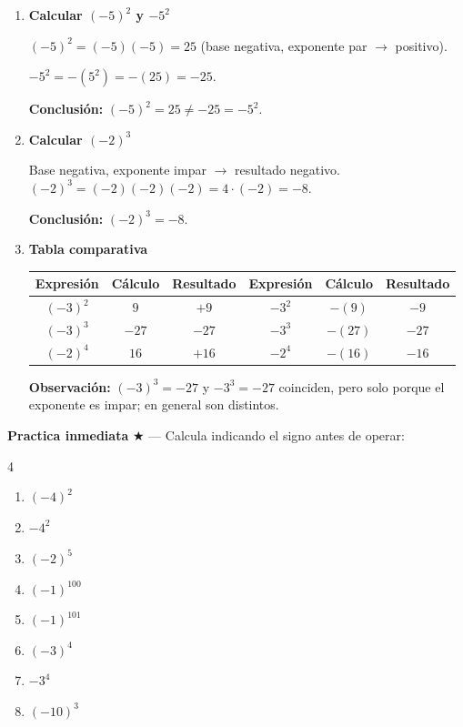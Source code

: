 \documentclass[11pt, letterpaper]{article}
\begin{document}
\begin{tcolorbox}[examplebox, title={Ejemplos --- potencias de base entera}]
\begin{enumerate}[label=\textbf{Ej. \arabic*.}, leftmargin=*, itemsep=12pt]

\item \textbf{Calcular $(-5)^2$ y $-5^2$}

$(-5)^2=(-5)(-5)=25$ (base negativa, exponente par $\to$ positivo).

$-5^2=-(5^2)=-(25)=-25$.

\textbf{Conclusi\'on:} $(-5)^2=25\neq -25=-5^2$.

\item \textbf{Calcular $(-2)^3$}

Base negativa, exponente impar $\to$ resultado negativo. $(-2)^3=(-2)(-2)(-2)=4\cdot(-2)=-8$.

\textbf{Conclusi\'on:} $(-2)^3=-8$.

\item \textbf{Tabla comparativa}

\begin{center}
\renewcommand{\arraystretch}{1.3}
\begin{tabular}{c|c|c||c|c|c}
\toprule
Expresi\'on & C\'alculo & Resultado & Expresi\'on & C\'alculo & Resultado\\
\midrule
$(-3)^2$ & $9$ & $+9$ & $-3^2$ & $-(9)$ & $-9$\\
$(-3)^3$ & $-27$ & $-27$ & $-3^3$ & $-(27)$ & $-27$\\
$(-2)^4$ & $16$ & $+16$ & $-2^4$ & $-(16)$ & $-16$\\
\bottomrule
\end{tabular}
\end{center}

\textbf{Observaci\'on:} $(-3)^3=-27$ y $-3^3=-27$ coinciden, pero solo porque el exponente es impar; en general son distintos.

\end{enumerate}
\end{tcolorbox}

\medskip
\textbf{Practica inmediata} \quad $\bigstar$ --- Calcula indicando el signo antes de operar:
\begin{multicols}{4}
\begin{enumerate}[label=\alph*), leftmargin=*]
  \item $(-4)^2$
  \item $-4^2$
  \item $(-2)^5$
  \item $(-1)^{100}$
  \item $(-1)^{101}$
  \item $(-3)^4$
  \item $-3^4$
  \item $(-10)^3$
\end{enumerate}
\end{multicols}
\end{document}
